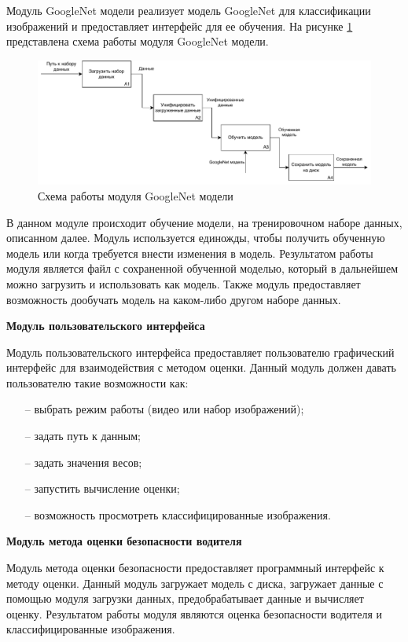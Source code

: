 Модуль GoogleNet модели реализует модель GoogleNet для классификации изображений и предоставляет интерфейс для ее обучения.
На рисунке \ref{fig:google_net_module} представлена схема работы модуля GoogleNet модели.
\begin{figure}[hbtp]
	\centering
	\includegraphics[scale=0.7]{img/google_net_module_v2.pdf}
	\caption{Схема работы модуля GoogleNet модели}
	\label{fig:google_net_module}
\end{figure}

В данном модуле происходит обучение модели, на тренировочном наборе данных, описанном далее. Модуль используется единожды, чтобы получить обученную модель или когда требуется внести изменения в модель. Результатом работы модуля является файл с сохраненной обученной моделью, который в дальнейшем можно загрузить и использовать как модель. Также модуль предоставляет возможность дообучать модель на каком-либо другом наборе данных.

\newpage
\textbf{Модуль пользовательского интерфейса}

Модуль пользовательского интерфейса предоставляет пользователю графический интерфейс для взаимодействия с методом оценки. Данный модуль должен давать пользователю такие возможности как: 
\begin{itemize}[leftmargin=1.6\parindent]
	\item[--] выбрать режим работы (видео или набор изображений);
	\item[--] задать путь к данным;
	\item[--] задать значения весов;
	\item[--] запустить вычисление оценки;
	\item[--] возможность просмотреть классифицированные изображения.
\end{itemize}

\textbf{Модуль метода оценки безопасности водителя}

Модуль метода оценки безопасности предоставляет программный интерфейс к методу оценки. Данный модуль загружает модель с диска, загружает данные с помощью модуля загрузки данных, предобрабатывает данные и вычисляет оценку. Результатом работы модуля являются оценка безопасности водителя и классифицированные изображения.


